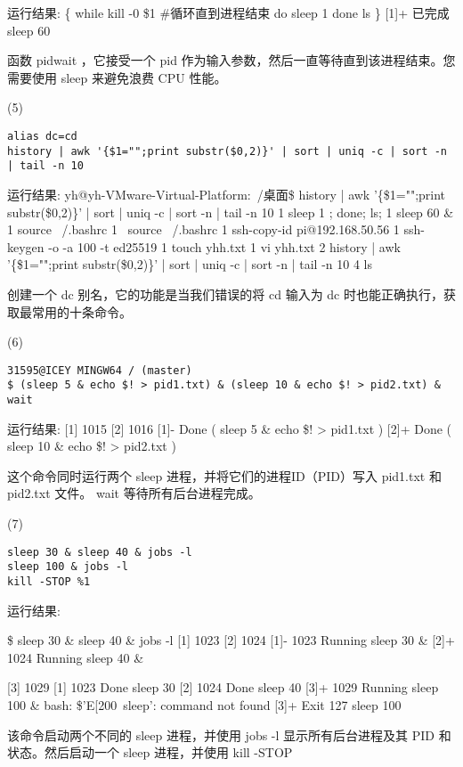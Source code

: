 \documentclass[a4paper, 12pt]{article}
\begin{document}
运行结果:
{\color{blue}
\{
   while kill -0 \$1 \#循环直到进程结束
   do
   sleep 1 
   done
   ls
\}
[1]+  已完成               sleep 60
}

函数 pidwait ，它接受一个 pid 作为输入参数，然后一直等待直到该进程结束。您需要使用 sleep 来避免浪费 CPU 性能。

(5)\begin{verbatim}
alias dc=cd
history | awk '{$1="";print substr($0,2)}' | sort | uniq -c | sort -n | tail -n 10
\end{verbatim}

运行结果:
{\color{blue}
yh@yh-VMware-Virtual-Platform:~/桌面\$ history | awk '\{\$1="";print substr(\$0,2)\}' | sort | uniq -c | sort -n | tail -n 10
      1 sleep 1 ; done; ls;
      1 sleep 60 \&
      1 source ~/.bashrc
      1 ~source ~/.bashrc
      1 ssh-copy-id pi@192.168.50.56
      1 ssh-keygen -o -a 100 -t ed25519
      1 touch yhh.txt
      1 vi yhh.txt
      2 history | awk '\{\$1="";print substr(\$0,2)\}' | sort | uniq -c | sort -n | tail -n 10
      4 ls
}

创建一个 dc 别名，它的功能是当我们错误的将 cd 输入为 dc 时也能正确执行，获取最常用的十条命令。

(6)\begin{verbatim}
31595@ICEY MINGW64 / (master)
$ (sleep 5 & echo $! > pid1.txt) & (sleep 10 & echo $! > pid2.txt) & wait
\end{verbatim}

运行结果:
{\color{blue}
[1] 1015
[2] 1016
[1]-  Done                    ( sleep 5 \& echo \$! > pid1.txt )
[2]+  Done                    ( sleep 10 \& echo \$! > pid2.txt )
}

这个命令同时运行两个 sleep 进程，并将它们的进程ID（PID）写入 pid1.txt 和 pid2.txt 文件。 wait 等待所有后台进程完成。

(7)\begin{verbatim}
sleep 30 & sleep 40 & jobs -l
sleep 100 & jobs -l
kill -STOP %1
\end{verbatim}

运行结果:
{\color{blue}
\$ sleep 30 \& sleep 40 \& jobs -l
[1] 1023
[2] 1024
[1]-  1023 Running                 sleep 30 \&
[2]+  1024 Running                 sleep 40 \&

[3] 1029
[1]   1023 Done                    sleep 30
[2]   1024 Done                    sleep 40
[3]+  1029 Running                 sleep 100 \&
bash: \$'E[200~sleep': command not found
[3]+  Exit 127                sleep 100
}

该命令启动两个不同的 sleep 进程，并使用 jobs -l 显示所有后台进程及其 PID 和状态。然后启动一个 sleep 进程，并使用 kill -STOP %
\end{document}
